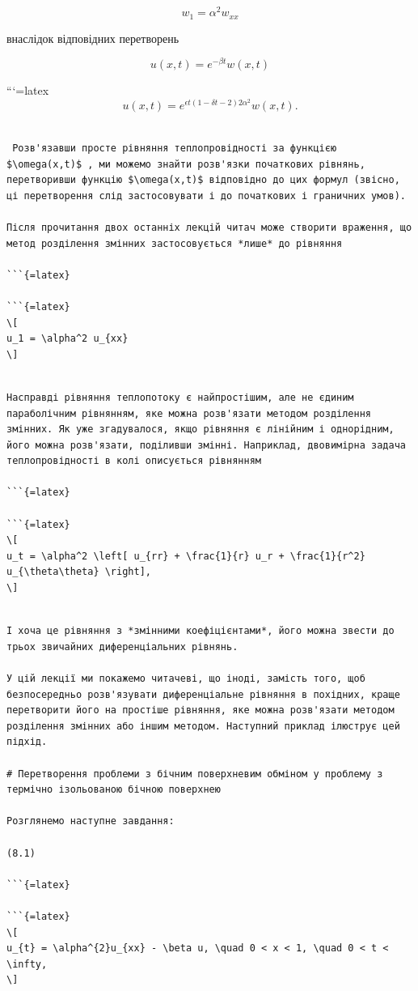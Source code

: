 \documentclass[
]{article}
\begin{document}
\[
w_1 = \alpha^2 w_{xx}
\]

внаслідок відповідних перетворень

\[
u(x, t) = e^{-\beta t} w(x, t)
\]

```{=latex}
\[
u(x, t) = e^{\epsilon t (1 - \delta t - 2) 2\alpha^2} w(x, t).
\]

\begin{verbatim}

 Розв'язавши просте рівняння теплопровідності за функцією $\omega(x,t)$ , ми можемо знайти розв'язки початкових рівнянь, перетворивши функцію $\omega(x,t)$ відповідно до цих формул (звісно, ці перетворення слід застосовувати і до початкових і граничних умов).

Після прочитання двох останніх лекцій читач може створити враження, що метод розділення змінних застосовується *лише* до рівняння

```{=latex}

```{=latex}
\[
u_1 = \alpha^2 u_{xx}
\]
\end{verbatim}

\begin{verbatim}

Насправді рівняння теплопотоку є найпростішим, але не єдиним параболічним рівнянням, яке можна розв'язати методом розділення змінних. Як уже згадувалося, якщо рівняння є лінійним і однорідним, його можна розв'язати, поділивши змінні. Наприклад, двовимірна задача теплопровідності в колі описується рівнянням

```{=latex}

```{=latex}
\[
u_t = \alpha^2 \left[ u_{rr} + \frac{1}{r} u_r + \frac{1}{r^2} u_{\theta\theta} \right],
\]
\end{verbatim}

\begin{verbatim}

І хоча це рівняння з *змінними коефіцієнтами*, його можна звести до трьох звичайних диференціальних рівнянь.

У цій лекції ми покажемо читачеві, що іноді, замість того, щоб безпосередньо розв'язувати диференціальне рівняння в похідних, краще перетворити його на простіше рівняння, яке можна розв'язати методом розділення змінних або іншим методом. Наступний приклад ілюструє цей підхід.

# Перетворення проблеми з бічним поверхневим обміном у проблему з термічно ізольованою бічною поверхнею

Розглянемо наступне завдання:

(8.1)

```{=latex}

```{=latex}
\[
u_{t} = \alpha^{2}u_{xx} - \beta u, \quad 0 < x < 1, \quad 0 < t < \infty,
\]
\end{verbatim}
\end{document}
